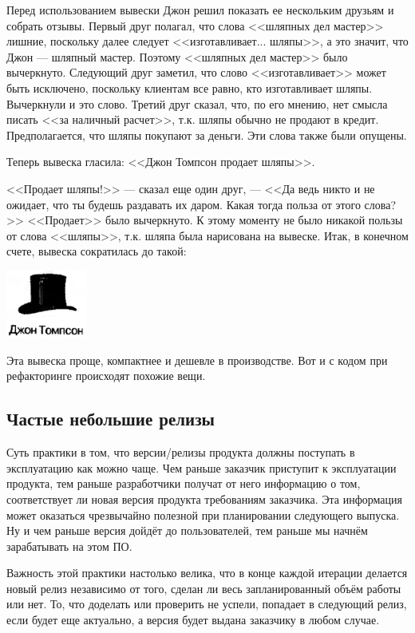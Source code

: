 \documentclass{../../text-style}
\begin{document}
Перед использованием вывески Джон решил показать ее нескольким друзьям и собрать отзывы. Первый друг полагал, что слова <<шляпных дел мастер>> лишние, поскольку далее следует <<изготавливает... шляпы>>, а это значит, что Джон --- шляпный мастер. Поэтому <<шляпных дел мастер>> было вычеркнуто. Следующий друг заметил, что слово <<изготавливает>> может быть исключено, поскольку клиентам все равно, кто изготавливает шляпы. Вычеркнули и это слово. Третий друг сказал, что, по его мнению, нет смысла писать <<за наличный расчет>>, т.к. шляпы обычно не продают в кредит. Предполагается, что шляпы покупают за деньги. Эти слова также были опущены.

Теперь вывеска гласила: <<Джон Томпсон продает шляпы>>.

<<Продает шляпы!>> --- сказал еще один друг, --- <<Да ведь никто и не ожидает, что ты будешь раздавать их даром. Какая тогда польза от этого слова?>> <<Продает>> было вычеркнуто. К этому моменту не было никакой пользы от слова <<шляпы>>, т.к. шляпа была нарисована на вывеске. Итак, в конечном счете, вывеска сократилась до такой:

\begin{center}
    \includegraphics[width=0.2\textwidth]{hatsRefactoringFinal.png}
\end{center}

Эта вывеска проще, компактнее и дешевле в производстве. Вот и с кодом при рефакторинге происходят похожие вещи.

\subsection{Частые небольшие релизы}

Суть практики в том, что версии/релизы продукта должны поступать в эксплуатацию как можно чаще. Чем раньше заказчик приступит к эксплуатации продукта, тем раньше разработчики получат от него информацию о том, соответствует ли новая версия продукта требованиям заказчика. Эта информация может оказаться чрезвычайно полезной при планировании следующего выпуска. Ну и чем раньше версия дойдёт до пользователей, тем раньше мы начнём зарабатывать на этом ПО.

Важность этой практики настолько велика, что в конце каждой итерации делается новый релиз независимо от того, сделан ли весь запланированный объём работы или нет. То, что доделать или проверить не успели, попадает в следующий релиз, если будет еще актуально, а версия будет выдана заказчику в любом случае.
\end{document}
